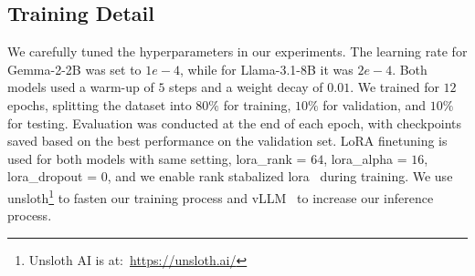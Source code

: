 \documentclass[11pt]{article}
\begin{document}
\subsection{Training Detail}
\label{appendix:training-detail}
We carefully tuned the hyperparameters in our experiments. The learning rate for Gemma-2-2B was set to $1e-4$, while for Llama-3.1-8B it was $2e-4$. Both models used a warm-up of $5$ steps and a weight decay of $0.01$. We trained for $12$ epochs, splitting the dataset into $80\%$ for training, $10\%$ for validation, and $10\%$ for testing.  Evaluation was conducted at the end of each epoch, with checkpoints saved based on the best performance on the validation set. LoRA finetuning is used for both models with same setting, lora\_rank = $64$, lora\_alpha = $16$, lora\_dropout = $0$, and we enable rank stabalized lora~\citep{kalajdzievski2023rankstabilizationscalingfactor} during training. We use unsloth\footnote{Unsloth AI is at:~\url{https://unsloth.ai/}}\label{web:unsloth} to fasten our training process and vLLM~\citep{kwon2023efficient} to increase our inference process.
\end{document}
